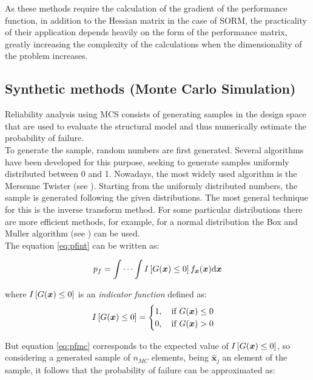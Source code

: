 As these methods require the calculation of the gradient of the performance function, in addition to the Hessian matrix in the case of SORM, the practicality of their application depends heavily on the form of the performance matrix, greatly increasing the complexity of the calculations when the dimensionality of the problem increases. \\

\subsection{Synthetic methods (Monte Carlo Simulation)}
Reliability analysis using MCS consists of generating samples in the design space that are used to evaluate the structural model and thus numerically estimate the probability of failure. \\


To generate the sample, random numbers are first generated. Several algorithms have been developed for this purpose, seeking to generate samples uniformly distributed between 0 and 1. Nowadays, the most widely used algorithm is the Mersenne Twister (see \citep{MT}). Starting from the uniformly distributed numbers, the sample is generated following the given distributions. The most general technique for this is the inverse transform method. For some particular distributions there are more efficient methods, for example, for a normal distribution the Box and Muller algorithm (see \citep{BM}) can be used. \\

The equation \ref{eq:pfint} can be written as: 

\begin{equation} \label{eq:pfmc}
    p_f = \int \cdots \int I\bracket{G(\bm{x}) \leq 0}f_{\bm{x}}(\bm{x})\mathrm{d}\bm{x}
\end{equation}

where $I\left[ G(\bm{x}) \leq 0 \right]$ is an \textit{indicator function} defined as:
\begin{equation}
I\left[ G(\bm{x}) \leq 0 \right] = 
\begin{cases}
1, \quad \text{if } G(\bm{x}) \leq 0 \\ 
0, \quad \text{if } G(\bm{x}) > 0
\end{cases}
\end{equation}

But equation \ref{eq:pfmc} corresponds to the expected value of $I\left[ G(\bm{x}) \leq 0 \right]$, so considering a generated sample of $n_{MC}$ elements, being $\bm{\hat{x}}_j$ an element of the sample, it follows that the probability of failure can be approximated as:

